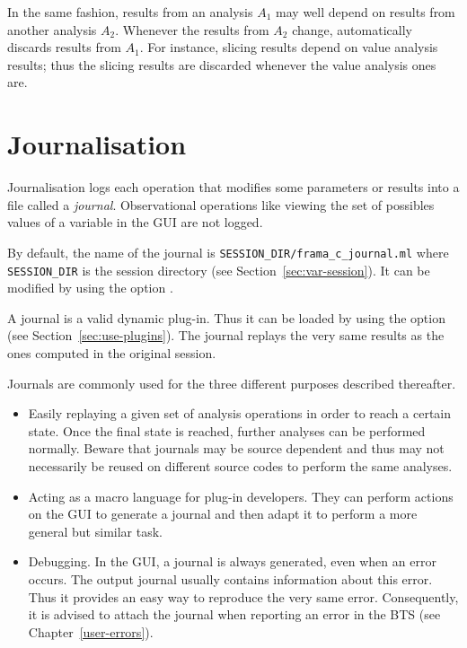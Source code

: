 In the same fashion, results from an analysis $A_1$ may well depend on results from another
analysis $A_2$. Whenever the results from $A_2$ change, \FramaC automatically discards
results from $A_1$. For instance, slicing results depend on value analysis
results; thus the slicing results are discarded whenever the value analysis
ones are.

\section{Journalisation}\label{sec:journal}

Journalisation logs each operation that modifies some parameters or results
into a file called a \emph{journal}. Observational
operations like viewing the set of possibles values of a variable in the GUI
are not logged.

By default, the name of the journal is
\texttt{SESSION\_DIR/frama\_c\_journal.ml} where \texttt{SESSION\_DIR} is the
\FramaC session directory (see Section~\ref{sec:var-session}). It can be
modified by using the option .

A journal is a valid \FramaC dynamic plug-in. Thus it can be loaded by using
the option  (see Section~\ref{sec:use-plugins}). The
journal replays the very same results as the ones computed in the original
session.

Journals are commonly used for the three different purposes described
thereafter.
\begin{itemize}
\item Easily replaying a given set of analysis operations in order to reach a
  certain state. Once the final state is reached, further analyses can be
  performed normally. Beware that journals may be source dependent and thus may
  not necessarily be reused on different source codes to perform the same
  analyses.
%
\item Acting as a macro language for plug-in developers. They can perform 
  actions on the GUI to generate a journal and then adapt it to perform
  a more general but similar task.
%
\item Debugging. In the GUI, a journal is always generated, even when an error
  occurs. The output journal usually contains information about this
  error. Thus it provides an easy way to reproduce the very same
  error. Consequently, it is advised to attach the journal when reporting an
  error in the \FramaC BTS (see Chapter~\ref{user-errors}).
\end{itemize}

